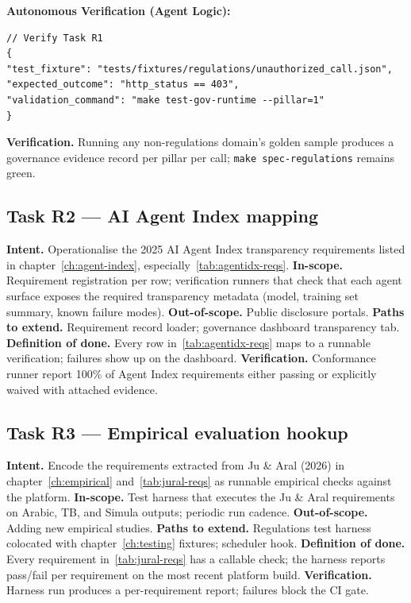 \documentclass[11pt,a4paper,twoside]{report}
\begin{document}
\textbf{Autonomous Verification (Agent Logic):}
\begin{lstlisting}[language=jsonx]
// Verify Task R1
{
"test_fixture": "tests/fixtures/regulations/unauthorized_call.json",
"expected_outcome": "http_status == 403",
"validation_command": "make test-gov-runtime --pillar=1"
}
\end{lstlisting}

\textbf{Verification.} Running any non-regulations domain's golden
sample produces a governance evidence record per pillar per call;
\texttt{make spec-regulations} remains green.

\subsection*{Task R2 --- AI Agent Index mapping}
\textbf{Intent.} Operationalise the 2025 AI Agent Index
transparency requirements listed in chapter~\ref{ch:agent-index},
especially~\ref{tab:agentidx-reqs}.
\textbf{In-scope.} Requirement registration per row; verification
runners that check that each agent surface exposes the required
transparency metadata (model, training set summary, known failure
modes).
\textbf{Out-of-scope.} Public disclosure portals.
\textbf{Paths to extend.} Requirement record loader; governance
dashboard transparency tab.
\textbf{Definition of done.} Every row in~\ref{tab:agentidx-reqs}
maps to a runnable verification; failures show up on the dashboard.
\textbf{Verification.} Conformance runner report 100\% of Agent
Index requirements either passing or explicitly waived with
attached evidence.

\subsection*{Task R3 --- Empirical evaluation hookup}
\textbf{Intent.} Encode the requirements extracted from Ju \& Aral
(2026) in chapter~\ref{ch:empirical} and~\ref{tab:jural-reqs} as
runnable empirical checks against the platform.
\textbf{In-scope.} Test harness that executes the Ju \& Aral
requirements on Arabic, TB, and Simula outputs; periodic run
cadence.
\textbf{Out-of-scope.} Adding new empirical studies.
\textbf{Paths to extend.} Regulations test harness colocated with
chapter~\ref{ch:testing} fixtures; scheduler hook.
\textbf{Definition of done.} Every requirement
in~\ref{tab:jural-reqs} has a callable check; the harness reports
pass/fail per requirement on the most recent platform build.
\textbf{Verification.} Harness run produces a per-requirement
report; failures block the CI gate.
\end{document}
